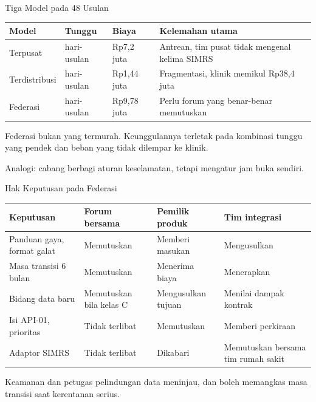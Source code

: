 \documentclass[aspectratio=169, table, 12pt]{beamer}
\begin{document}
\begin{frame}{{\Large Tiga Model pada 48 Usulan}}
  \footnotesize
  \begin{tabularx}{\textwidth}{>{\raggedright\arraybackslash}p{2.3cm} >{\raggedright\arraybackslash}p{2.4cm} >{\raggedright\arraybackslash}p{1.9cm} >{\raggedright\arraybackslash}X}
    \hline
    \textbf{Model} & \textbf{Tunggu} & \textbf{Biaya} & \textbf{Kelemahan utama} \\ \hline
    Terpusat & 480 hari-usulan & Rp7,2 juta & Antrean, tim pusat tidak mengenal kelima SIMRS \\ \hline
    Terdistribusi & 48 hari-usulan & Rp1,44 juta & Fragmentasi, klinik memikul Rp38,4 juta \\ \hline
    Federasi & 112 hari-usulan & Rp9,78 juta & Perlu forum yang benar-benar memutuskan \\ \hline
  \end{tabularx}

  \vspace{8pt}
  \small Federasi bukan yang termurah. Keunggulannya terletak pada kombinasi tunggu yang pendek dan beban yang tidak dilempar ke klinik.

  \vspace{4pt}
  \small Analogi: cabang berbagi aturan keselamatan, tetapi mengatur jam buka sendiri.
\end{frame}

\begin{frame}{{\Large Hak Keputusan pada Federasi}}
  \footnotesize
  \begin{tabularx}{\textwidth}{>{\raggedright\arraybackslash}p{3.0cm} >{\raggedright\arraybackslash}X >{\raggedright\arraybackslash}X >{\raggedright\arraybackslash}X}
    \hline
    \textbf{Keputusan} & \textbf{Forum bersama} & \textbf{Pemilik produk} & \textbf{Tim integrasi} \\ \hline
    Panduan gaya, format galat & Memutuskan & Memberi masukan & Mengusulkan \\ \hline
    Masa transisi 6 bulan & Memutuskan & Menerima biaya & Menerapkan \\ \hline
    Bidang data baru & Memutuskan bila kelas C & Mengusulkan tujuan & Menilai dampak kontrak \\ \hline
    Isi API-01, prioritas & Tidak terlibat & Memutuskan & Memberi perkiraan \\ \hline
    Adaptor SIMRS & Tidak terlibat & Dikabari & Memutuskan bersama tim rumah sakit \\ \hline
  \end{tabularx}

  \vspace{8pt}
  \small Keamanan dan petugas pelindungan data meninjau, dan boleh memangkas masa transisi saat kerentanan serius.
\end{frame}
\end{document}
